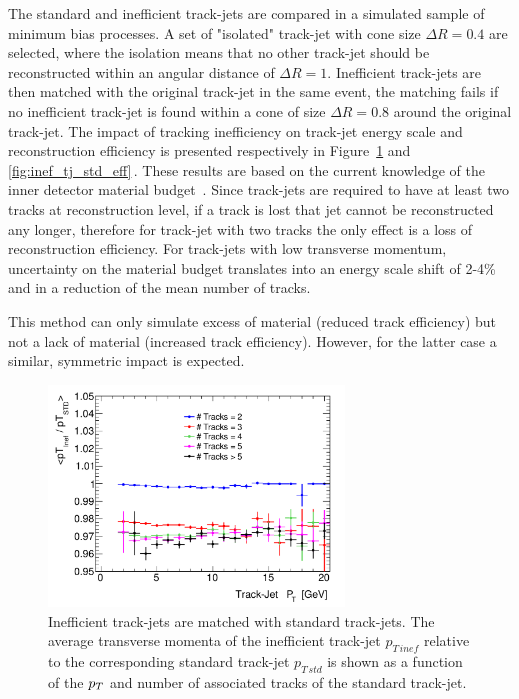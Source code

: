 The standard and inefficient track-jets are compared in a simulated sample of minimum bias processes. 
A set of "isolated" track-jet with cone size $\Delta R = 0.4$ are selected, where the isolation 
means that no other track-jet should be reconstructed within an angular distance of $\Delta R = 1$. 
Inefficient track-jets are then matched with the original track-jet in the same event,
the matching fails if no inefficient track-jet is found within a cone of size $\Delta R = 0.8$ around
the original track-jet. The impact of tracking inefficiency on track-jet energy scale and reconstruction
efficiency is presented respectively in Figure~\ref{fig:inef_tj_std_scale} and \ref{fig:inef_tj_std_eff}$\,$. These 
results are based on the current knowledge of the inner detector material budget~\cite{IDMaterial}. 
Since track-jets are required to have at least two tracks at reconstruction level, if a track 
is lost that jet  cannot be reconstructed any longer, therefore for track-jet with two tracks 
the only effect is a loss of reconstruction efficiency. For track-jets with low transverse momentum, uncertainty on the material budget 
translates into an energy scale shift of 2-4\% and in a reduction of the mean number of tracks.

This method can only simulate excess of material (reduced track efficiency) but not a lack of material
(increased track efficiency). However, for the latter case a similar, symmetric impact is expected.

\begin{figure}[tp]
\centering
\includegraphics[width=0.7\textwidth]{figure/trackjet/T7/Sys_pt_nTrack2.pdf} 
\caption{Inefficient track-jets are matched with standard track-jets. The average transverse momenta of the inefficient track-jet $p_{T \, inef}$
	relative to the corresponding standard track-jet $p_{T \, std}$ is shown as a function of the 
	$p_{T}$ and number of associated tracks of the standard track-jet.}

\label{fig:inef_tj_std_scale}
\end{figure}    


